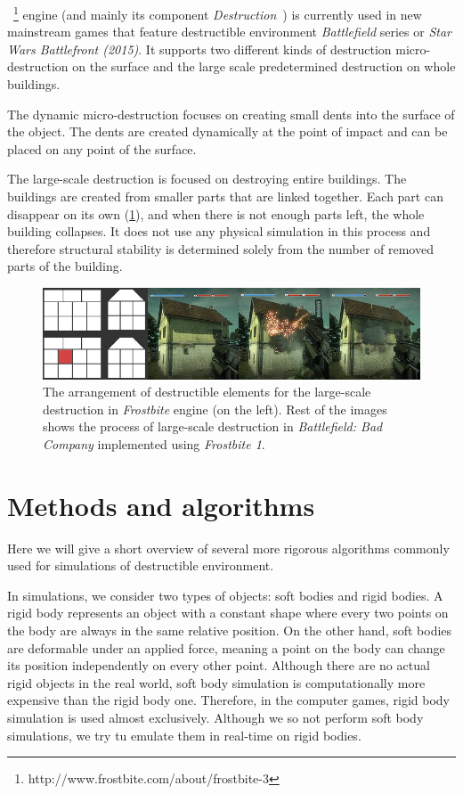~\footnote{http://www.frostbite.com/about/frostbite-3} engine (and mainly its component \emph{Destruction}~\cite{destruction}) is currently used in new mainstream games that feature destructible environment \eg \emph{Battlefield} series or \emph{Star Wars Battlefront (2015)}. It supports two different kinds of destruction micro-destruction on the surface and the large scale predetermined destruction on whole buildings. 

The dynamic micro-destruction focuses on creating small dents into the surface of the object. The dents are created dynamically at the point of impact and can be placed on any point of the surface.

The large-scale destruction is focused on destroying entire buildings. The buildings are created from smaller parts that are linked together. Each part can disappear on its own (\cref{fig:frostbite}), and when there is not enough parts left, the whole building collapses. It does not use any physical simulation in this process and therefore structural stability is determined solely from the number of removed parts of the building.

\begin{figure}
\centering
\includegraphics[width=\textwidth]{img/frostbite}
\caption{The arrangement of destructible elements for the large-scale destruction in \emph{Frostbite} engine (on the left). Rest of the images shows the process of large-scale destruction in \emph{Battlefield: Bad Company} implemented using \emph{Frostbite 1}.}
\label{fig:frostbite}
\end{figure}

\section{Methods and algorithms}

Here we will give a short overview of several more rigorous algorithms commonly used for simulations of destructible environment. 

In simulations, we consider two types of objects: soft bodies and rigid bodies. A rigid body represents an object with a constant shape where every two points on the body are always in the same relative position. On the other hand, soft bodies are deformable under an applied force, meaning a point on the body can change its position independently on every other point. Although there are no actual rigid objects in the real world, soft body simulation is computationally more expensive than the rigid body one. Therefore, in the computer games, rigid body simulation is used almost exclusively. Although we so not perform soft body simulations, we try tu emulate them in real-time on rigid bodies.

